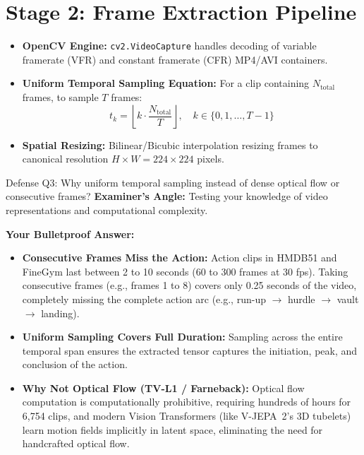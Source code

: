 \documentclass[a4paper, 11pt]{article}
\begin{document}
\section{Stage 2: Frame Extraction Pipeline}

\begin{techbox}
\begin{itemize}
    \item \textbf{OpenCV Engine:} \texttt{cv2.VideoCapture} handles decoding of variable framerate (VFR) and constant framerate (CFR) MP4/AVI containers.
    \item \textbf{Uniform Temporal Sampling Equation:} For a clip containing $N_{\text{total}}$ frames, to sample $T$ frames:
    \[
    t_k = \left\lfloor k \cdot \frac{N_{\text{total}}}{T} \right\rfloor, \quad k \in \{0, 1, \dots, T-1\}
    \]
    \item \textbf{Spatial Resizing:} Bilinear/Bicubic interpolation resizing frames to canonical resolution $H \times W = 224 \times 224$ pixels.
\end{itemize}
\end{techbox}

\begin{defensebox}{Defense Q3: Why uniform temporal sampling instead of dense optical flow or consecutive frames?}
\textbf{Examiner's Angle:} Testing your knowledge of video representations and computational complexity.

\textbf{Your Bulletproof Answer:}
\begin{itemize}
    \item \textbf{Consecutive Frames Miss the Action:} Action clips in HMDB51 and FineGym last between 2 to 10 seconds (60 to 300 frames at 30 fps). Taking consecutive frames (e.g., frames 1 to 8) covers only 0.25 seconds of the video, completely missing the complete action arc (e.g., run-up $\rightarrow$ hurdle $\rightarrow$ vault $\rightarrow$ landing).
    \item \textbf{Uniform Sampling Covers Full Duration:} Sampling across the entire temporal span ensures the extracted tensor captures the initiation, peak, and conclusion of the action.
    \item \textbf{Why Not Optical Flow (TV-L1 / Farneback):} Optical flow computation is computationally prohibitive, requiring hundreds of hours for 6,754 clips, and modern Vision Transformers (like V-JEPA~2's 3D tubelets) learn motion fields implicitly in latent space, eliminating the need for handcrafted optical flow.
\end{itemize}
\end{defensebox}
\end{document}
